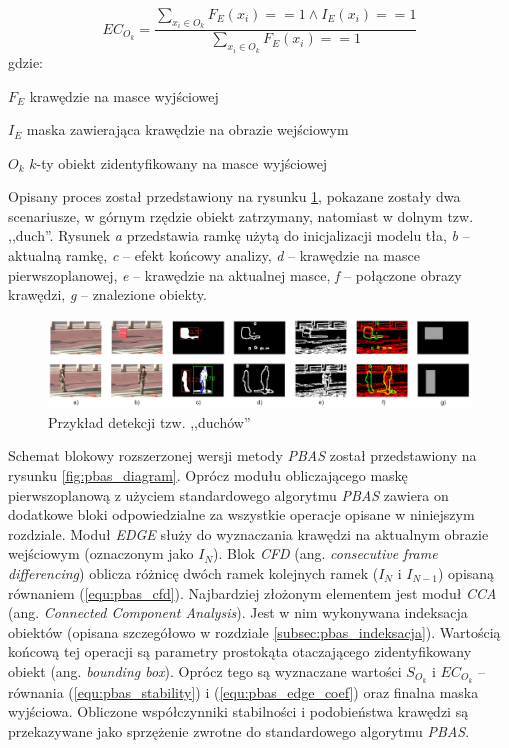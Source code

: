     \begin{equation}
        EC_{O_k} = \frac{ \sum_{x_i \in O_k} F_E(x_i) == 1 \land I_E(x_i) == 1 }{ \sum_{x_i \in O_k} F_E(x_i) == 1 }
    \label{equ:pbas_edge_coef}
    \end{equation}
gdzie:
\begin{eqwhere}[2.2cm]
	\item[$F_E$] krawędzie na masce wyjściowej
	\item[$I_E$] maska zawierająca krawędzie na obrazie wejściowym
	\item[$O_k$] $k$-ty obiekt zidentyfikowany na masce wyjściowej
\end{eqwhere}

Opisany proces został przedstawiony na rysunku \ref{fig:pbas_ec_example}, pokazane zostały dwa scenariusze, w górnym rzędzie obiekt zatrzymany, natomiast w dolnym tzw. ,,duch''. Rysunek \textit{a} przedstawia ramkę użytą do inicjalizacji modelu tła, \textit{b} -- aktualną ramkę, \textit{c} -- efekt końcowy analizy, \textit{d} -- krawędzie na masce pierwszoplanowej, \textit{e} -- krawędzie na aktualnej masce, \textit{f} -- połączone obrazy krawędzi, \textit{g} -- znalezione obiekty.

	\begin{figure}[h]
		\centering
		\includegraphics[scale=0.28]{img/3/ec_example.png}
		\caption{Przykład detekcji tzw. ,,duchów''}
		\label{fig:pbas_ec_example}
	\end{figure}

Schemat blokowy rozszerzonej wersji metody \textit{PBAS} został przedstawiony na rysunku \ref{fig:pbas_diagram}. 
Oprócz modułu obliczającego maskę pierwszoplanową z użyciem standardowego algorytmu \textit{PBAS} zawiera on dodatkowe bloki odpowiedzialne za wszystkie operacje opisane w niniejszym rozdziale. 
Moduł \textit{EDGE} służy do wyznaczania krawędzi na aktualnym obrazie wejściowym (oznaczonym jako $I_N$). 
Blok \textit{CFD} (ang. \textit{consecutive frame differencing}) oblicza różnicę dwóch ramek kolejnych ramek ($I_N$ i $I_{N-1}$) opisaną równaniem (\ref{equ:pbas_cfd}). 
Najbardziej złożonym elementem jest moduł \textit{CCA} (ang. \textit{Connected Component Analysis}). 
Jest w nim wykonywana indeksacja obiektów (opisana szczegółowo w rozdziale \ref{subsec:pbas_indeksacja}). 
Wartością końcową tej operacji są parametry prostokąta otaczającego zidentyfikowany obiekt (ang. \textit{bounding box}). 
Oprócz tego są wyznaczane wartości $S_{O_k}$ i $EC_{O_k}$ -- równania (\ref{equ:pbas_stability}) i (\ref{equ:pbas_edge_coef}) oraz finalna maska wyjściowa. 
Obliczone współczynniki stabilności i podobieństwa krawędzi są przekazywane jako sprzężenie zwrotne do standardowego algorytmu \textit{PBAS}.

